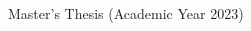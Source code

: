 \begin{titlepage}
  \begin{center}
    \begin{large}
      Master's Thesis (Academic Year 2023)\\
      \vspace{24pt}
      \begin{spacing}{1.4}
        {\huge\textbf{\etitle}}\\
      \end{spacing}
    \end{large}
  \end{center}
  \vspace{40em}
  \begin{flushright}
    \large \edept\\
    \eauthor
  \end{flushright}
\end{titlepage}
